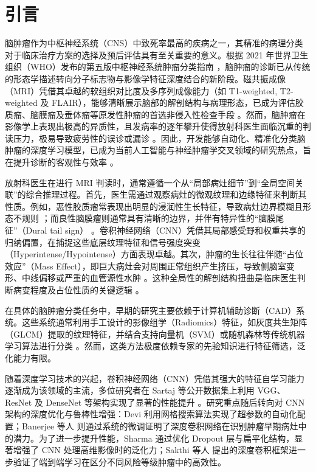 \section{引言}

脑肿瘤作为中枢神经系统（CNS）中致死率最高的疾病之一，其精准的病理分类对于临床治疗方案的选择及预后评估具有至关重要的意义。根据 2021 年世界卫生组织（WHO）发布的第五版中枢神经系统肿瘤分类指南 \cite{Louis2021WHO}，脑肿瘤的诊断已从传统的形态学描述转向分子标志物与影像学特征深度结合的新阶段。磁共振成像（MRI）凭借其卓越的软组织对比度及多序列成像能力（如 T1-weighted, T2-weighted 及 FLAIR），能够清晰展示脑部的解剖结构与病理形态，已成为评估胶质瘤、脑膜瘤及垂体瘤等原发性肿瘤的首选非侵入性检查手段 \cite{Vaskovic2023Normal}。然而，脑肿瘤在影像学上表现出极高的异质性，且发病率的逐年攀升使得放射科医生面临沉重的判读压力，极易导致疲劳性的误诊或漏诊 \cite{Younis2023Survey}。因此，开发能够自动化、精准化分类脑肿瘤的深度学习模型，已成为当前人工智能与神经肿瘤学交叉领域的研究热点，旨在提升诊断的客观性与效率 \cite{Khalighi2024AI}。

放射科医生在进行 MRI 判读时，通常遵循一个从“局部病灶细节”到“全局空间关联”的综合推理过程。首先，医生需通过观察病灶的微观纹理和边缘特征来判断其性质。例如，恶性胶质瘤常表现出明显的浸润性生长特征，导致病灶边界模糊且形态不规则 \cite{Hakyemez2005Glioma}；而良性脑膜瘤则通常具有清晰的边界，并伴有特异性的“脑膜尾征”（Dural tail sign） \cite{Starr2017Meningioma}。卷积神经网络（CNN）凭借其局部感受野和权重共享的归纳偏置，在捕捉这些底层纹理特征和信号强度突变（Hyperintense/Hypointense）方面表现卓越。其次，肿瘤的生长往往伴随“占位效应”（Mass Effect），即巨大病灶会对周围正常组织产生挤压，导致侧脑室变形、中线偏移或严重的血管源性水肿 \cite{Smirniotopoulos2020Differential}。这种全局性的解剖结构扭曲是临床医生判断病变程度及占位性质的关键逻辑 \cite{Cleveland2024Brain}。

在具体的脑肿瘤分类任务中，早期的研究主要依赖于计算机辅助诊断（CAD）系统。这些系统通常利用手工设计的影像组学（Radiomics）特征，如灰度共生矩阵（GLCM）提取的纹理特征，并结合支持向量机（SVM）或随机森林等传统机器学习算法进行分类 \cite{Lohmann2020Radiomics}。然而，这类方法极度依赖专家的先验知识进行特征筛选，泛化能力有限。

随着深度学习技术的兴起，卷积神经网络（CNN）凭借其强大的特征自学习能力逐渐成为该领域的主流，多位研究者在 Sartaj 等公开数据集上利用 VGG、ResNet 及 DenseNet 等架构实现了显著的性能提升 \cite{Younis2023Survey}。研究重点随后转向对 CNN 架构的深度优化与鲁棒性增强：Devi \cite{Devi2021Detection} 利用网格搜索算法实现了超参数的自动化配置；Banerjee 等人 \cite{Banerjee2023Hyperparameter} 则通过系统的微调证明了深度卷积网络在识别肿瘤早期病灶中的潜力。为了进一步提升性能，Sharma \cite{Sharma2024Enhanced} 通过优化 Dropout 层与扁平化结构，显著增强了 CNN 处理高维影像时的泛化力；Sakthi 等人 \cite{Sakthi2023Deep} 提出的深度卷积框架进一步验证了端到端学习在区分不同风险等级肿瘤中的高效性。

